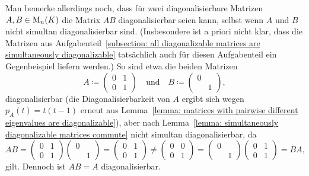 \begin{remark}
  Man bemerke allerdings noch, dass für zwei diagonalisierbare Matrizen $A, B \in \operatorname{M}_{n}(K)$ die Matrix $AB$ diagonalisierbar seien kann, selbst wenn $A$ und $B$ nicht simultan diagonalisierbar sind.
  (Insbesondere ist a priori nicht klar, dass die Matrizen aus Aufgabenteil~\ref{subsection: all diagonalizable matrices are simultaneously diagonalizable} tatsächlich auch für diesen Aufgabenteil ein Gegenbeispiel liefern werden.)
  So sind etwa die beiden Matrizen
  \[
              A
    \coloneqq \begin{pmatrix}
                0 & 1
                \\
                0 & 1
              \end{pmatrix}
    \quad\text{und}\quad
              B
    \coloneqq \begin{pmatrix}
                0 & 
                \\
                  & 1
              \end{pmatrix},
  \]
  diagonalisierbar (die Diagonalisierbarkeit von $A$ ergibt sich wegen $p_A(t) = t(t-1)$ erneut aus Lemma~\ref{lemma: matrices with pairwise different eigenvalues are diagonalizable}), aber nach Lemma~\ref{lemma: simultaneously diagonalizable matrices commute} nicht simultan diagonalisierbar, da
\[
        A B
  =     \begin{pmatrix}
          0 & 1
          \\
          0 & 1
        \end{pmatrix}
        \begin{pmatrix}
          0 & 
          \\
            & 1
        \end{pmatrix}
  =     \begin{pmatrix}
          0 & 1
          \\
          0 & 1
        \end{pmatrix}
  \neq  \begin{pmatrix}
          0 & 0
          \\
          0 & 1
        \end{pmatrix}
  =     \begin{pmatrix}
          0 & 
          \\
            & 1
        \end{pmatrix}
        \begin{pmatrix}
          0 & 1
          \\
          0 & 1
        \end{pmatrix}
  =     B A,
\]
gilt.
Dennoch ist $A B = A$ diagonalisierbar.
\end{remark}





